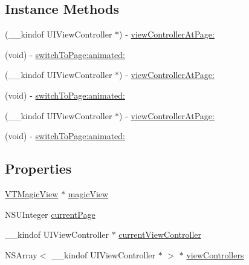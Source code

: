 \subsection*{Instance Methods}
\begin{DoxyCompactItemize}
\item 
(\+\_\+\+\_\+kindof U\+I\+View\+Controller $\ast$) -\/ \mbox{\hyperlink{interface_v_t_magic_controller_af1fc3321dd2ba20039f764b858a5492b}{view\+Controller\+At\+Page\+:}}
\item 
(void) -\/ \mbox{\hyperlink{interface_v_t_magic_controller_aa1d4db425d8e4c189aabba581bec2c7f}{switch\+To\+Page\+:animated\+:}}
\item 
(\+\_\+\+\_\+kindof U\+I\+View\+Controller $\ast$) -\/ \mbox{\hyperlink{interface_v_t_magic_controller_ac79d790a9883586d281782ceeb5d7ef3}{view\+Controller\+At\+Page\+:}}
\item 
(void) -\/ \mbox{\hyperlink{interface_v_t_magic_controller_aa1d4db425d8e4c189aabba581bec2c7f}{switch\+To\+Page\+:animated\+:}}
\item 
(\+\_\+\+\_\+kindof U\+I\+View\+Controller $\ast$) -\/ \mbox{\hyperlink{interface_v_t_magic_controller_ac79d790a9883586d281782ceeb5d7ef3}{view\+Controller\+At\+Page\+:}}
\item 
(void) -\/ \mbox{\hyperlink{interface_v_t_magic_controller_aa1d4db425d8e4c189aabba581bec2c7f}{switch\+To\+Page\+:animated\+:}}
\end{DoxyCompactItemize}
\subsection*{Properties}
\begin{DoxyCompactItemize}
\item 
\mbox{\hyperlink{interface_v_t_magic_view}{V\+T\+Magic\+View}} $\ast$ \mbox{\hyperlink{interface_v_t_magic_controller_af00d2a9746570370dbea3e1cb614971b}{magic\+View}}
\item 
N\+S\+U\+Integer \mbox{\hyperlink{interface_v_t_magic_controller_ae64ac7e541c6ebb74ff031726deb5ab1}{current\+Page}}
\item 
\+\_\+\+\_\+kindof U\+I\+View\+Controller $\ast$ \mbox{\hyperlink{interface_v_t_magic_controller_a19d1c8f57c7f21d7547ce8af7acc53f5}{current\+View\+Controller}}
\item 
N\+S\+Array$<$ \+\_\+\+\_\+kindof U\+I\+View\+Controller $\ast$ $>$ $\ast$ \mbox{\hyperlink{interface_v_t_magic_controller_a01168e3df45e1906ff07f3c8d4caf14f}{view\+Controllers}}
\end{DoxyCompactItemize}


